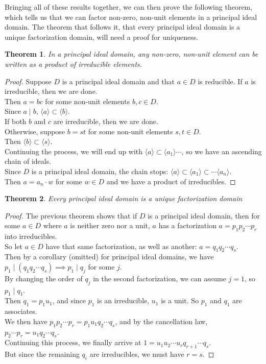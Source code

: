 \documentclass[11pt]{amsart}
\newtheorem{theorem}{Theorem}[section]
\theoremstyle{definition}
\begin{document}
Bringing all of these results together, we can then prove the following theorem, which tells us that we can factor non-zero, non-unit elements
in a principal ideal domain. The theorem that follows it, that every principal ideal domain is a unique factorization domain, will need a proof for
uniqueness.
\begin{theorem}
	In a principal ideal domain, any non-zero, non-unit element can be written as a product of irreducible elements.
\end{theorem}
\begin{proof}
	Suppose $D$ is a principal ideal domain and that $a \in D$ is reducible. If $a$ is irreducible, then we are done. \\
	Then $a = bc$ for some non-unit elements $b, c \in D$. \\
	Since $a \mid b$, $\langle a \rangle \subset \langle b \rangle$. \\
	If both $b$ and $c$ are irreducible, then we are done. \\
	Otherwise, suppose $b = st$ for some non-unit elements $s, t \in D$. \\
	Then $\langle b \rangle \subset \langle s \rangle$. \\
	Continuing the process, we will end up with $\langle a \rangle \subset \langle a_1 \rangle \cdots$, so we have an ascending
	chain of ideals. \\
	Since $D$ is a principal ideal domain, the chain stops: 
	$\langle a \rangle \subset \langle a_1 \rangle \subset \cdots \langle a_n \rangle$. \\
	Then $a = a_n \cdot w$ for some $w \in D$ and we have a product of irreducibles.
\end{proof}
\begin{theorem}
	Every principal ideal domain is a unique factorization domain
\end{theorem}
\begin{proof}
	The previous theorem shows that if $D$ is a principal ideal domain, then for some $a \in D$ where $a$ is neither zero nor a unit, $a$
	has a factorization $a = p_1 p_2 \cdots p_r$ into irreducibles. \\
	So let $a \in D$ have that same factorization, as well as another: $a = q_1 q_2 \cdots q_s$. \\
	Then by a corollary (omitted) for principal ideal domains, we have $p_1 \mid (q_1 q_2 \cdots q_s) \implies p_1 \mid q_j$ for some $j$. \\
	By changing the order of $q_j$ in the second factorization, we can assume $j = 1$, so $p_1 \mid q_1$. \\
	Then $q_1 = p_1 u_1$, and since $p_1$ is an irreducible, $u_1$ is a unit. So $p_1$ and $q_1$ are associates. \\
	We then have $p_1 p_2 \cdots p_r = p_1 u_1 q_2 \cdots q_s$, and by the cancellation law, $p_2 \cdots p_r = u_1 q_2 \cdots q_s$. \\
	Continuing this process, we finally arrive at $1 = u_1 u_2 \cdots u_r q_{r+1} \cdots q_s$. \\
	But since the remaining $q_i$ are irreducibles, we must have $r = s$.
\end{proof}
\newpage
\end{document}

